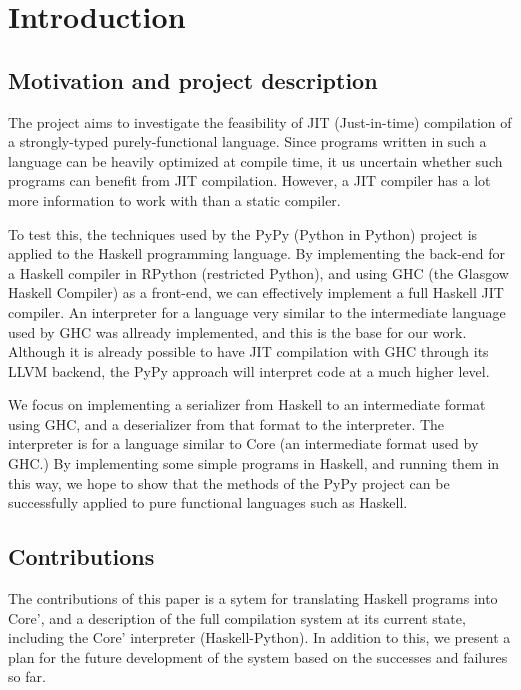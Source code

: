 
\chapter{Introduction}

\section{Motivation and project description}

The project aims to investigate the feasibility of JIT (Just-in-time) 
compilation of a strongly-typed purely-functional language. Since
programs written in such a language can be heavily optimized at 
compile time, it us uncertain whether such programs can benefit from
JIT compilation. However, a JIT compiler has a lot more information to
work with than a static compiler. 

To test this, the techniques 
used by the PyPy (Python in Python) project is applied to the Haskell 
programming language. By implementing the back-end for a Haskell compiler 
in RPython (restricted Python), and using GHC (the Glasgow Haskell Compiler) 
as a front-end, we can effectively implement a full Haskell JIT compiler. An 
interpreter for a language very similar to the intermediate language used
by GHC was allready implemented, and this is the base for our work.
Although it is already possible to have JIT compilation with GHC through
its LLVM backend, the PyPy approach will interpret code at a much higher level.

We focus on implementing a serializer from Haskell to an intermediate
format using GHC, and a deserializer from that format to the interpreter. The 
interpreter is for a language similar to Core (an intermediate format used by GHC.)
By implementing some simple programs in Haskell, and running them in this way, 
we hope to show that the methods of the PyPy project can be successfully applied 
to pure functional languages such as Haskell.


\section{Contributions}
The contributions of this paper is a sytem for translating Haskell programs
into Core', and a description of the full compilation system at its current
state, including the Core' interpreter (Haskell-Python). In addition to this,
we present a plan for the future development of the system based on the 
successes and failures so far.

